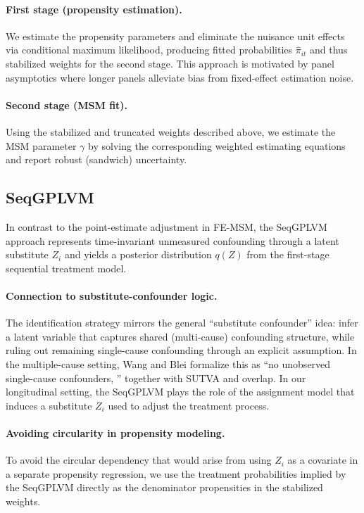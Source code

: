 \paragraph{First stage (propensity estimation).}
We estimate the propensity parameters and eliminate the nuisance unit effects via conditional maximum likelihood, producing fitted probabilities $\widehat{\pi}_{it}$ and thus stabilized weights for the second stage. This approach is motivated by panel asymptotics where longer panels alleviate bias from fixed-effect estimation noise.

\paragraph{Second stage (MSM fit).}
Using the stabilized and truncated weights described above, we estimate the MSM parameter $\gamma$ by solving the corresponding weighted estimating equations and report robust (sandwich) uncertainty.

\subsection{SeqGPLVM}
In contrast to the point-estimate adjustment in FE-MSM, the SeqGPLVM approach represents time-invariant unmeasured confounding through a latent substitute $Z_i$ and yields a posterior distribution $q(Z)$ from the first-stage sequential treatment model.

\paragraph{Connection to substitute-confounder logic.}
The identification strategy mirrors the general 
``substitute confounder'' idea: infer a latent variable that captures 
shared (multi-cause) confounding structure, while ruling out remaining 
single-cause confounding through an explicit assumption. In the multiple-cause 
setting, Wang and Blei formalize this as ``no unobserved single-cause confounders,
'' together with SUTVA and overlap. In our longitudinal setting, the SeqGPLVM plays 
the role of the assignment model that induces a substitute $Z_i$ used to adjust the 
treatment process.

\paragraph{Avoiding circularity in propensity modeling.}
To avoid the circular dependency that would arise from using $Z_i$ as a covariate in a separate propensity regression, we use the treatment probabilities implied by the SeqGPLVM directly as the denominator propensities in the stabilized weights.

